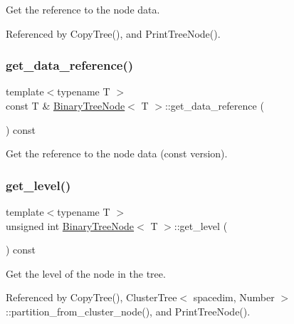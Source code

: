 Get the reference to the node data. 

Referenced by Copy\+Tree(), and Print\+Tree\+Node().

\mbox{\label{classBinaryTreeNode_a6bfbb8840c8a263ffcaacb0b7b61170c}} 
\subsubsection{\texorpdfstring{get\+\_\+data\+\_\+reference()}{get\_data\_reference()}\hspace{0.1cm}{\footnotesize\ttfamily [2/2]}}
{\footnotesize\ttfamily template$<$typename T $>$ \\
const T \& \hyperlink{classBinaryTreeNode}{Binary\+Tree\+Node}$<$ T $>$\+::get\+\_\+data\+\_\+reference (\begin{DoxyParamCaption}{ }\end{DoxyParamCaption}) const}

Get the reference to the node data (const version). \mbox{\label{classBinaryTreeNode_aa89de0a58ae53ae5eb701bec3adc880a}} 
\subsubsection{\texorpdfstring{get\+\_\+level()}{get\_level()}}
{\footnotesize\ttfamily template$<$typename T $>$ \\
unsigned int \hyperlink{classBinaryTreeNode}{Binary\+Tree\+Node}$<$ T $>$\+::get\+\_\+level (\begin{DoxyParamCaption}{ }\end{DoxyParamCaption}) const}

Get the level of the node in the tree. 

Referenced by Copy\+Tree(), Cluster\+Tree$<$ spacedim, Number $>$\+::partition\+\_\+from\+\_\+cluster\+\_\+node(), and Print\+Tree\+Node().

\mbox{\label{classBinaryTreeNode_a0c22f12230f685c522ab80484ce4ce7f}} 
